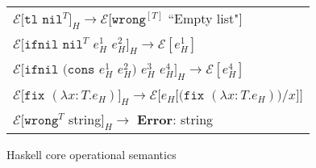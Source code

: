 \begin{figure}[ph!]
\begin{tabular}{l}
$\mathscr{E}[\mathtt{tl}$ $\mathtt{nil}^{T}]_{H}\rightarrow\mathscr{E}[\mathtt{wrong}^{[T]}$ ``Empty list"$]$ \\

\vspace{5pt}

$\mathscr{E}[\mathtt{ifnil}$ $\mathtt{nil}^{T}$ $e_{H}^{1}$ $e_{H}^{2}]_{H}\rightarrow\mathscr{E}[e_{H}^{1}]$ \\

\vspace{5pt}

$\mathscr{E}[\mathtt{ifnil}$ $(\mathtt{cons}$ $e_{H}^{1}$ $e_{H}^{2})$ $e_{H}^{3}$ $e_{H}^{4}]_{H}\rightarrow\mathscr{E}[e_{H}^{4}]$ \\

\vspace{5pt}

$\mathscr{E}[\mathtt{fix}$ $(\lambda x:T.e_{H})]_{H}\rightarrow\mathscr{E}[e_{H}[(\mathtt{fix}$ $(\lambda x:T.e_{H}))/x]]$ \\

\vspace{5pt}

$\mathscr{E}[\mathtt{wrong}^{T}$ string$]_{H}\rightarrow$ \textbf{Error}: string
\end{tabular}
\caption{Haskell core operational semantics}
\label{hcos}
\end{figure}